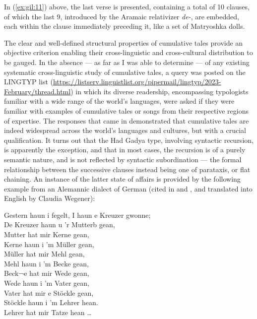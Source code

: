 \documentclass[output=paper,colorlinks,citecolor=brown
]{langscibook}
\begin{document}
\z

In (\ref{ex:gil:11}) above, the last verse is presented, containing a total of 10 clauses, of which the last 9, introduced by the Aramaic relativizer \emph{de-}, are embedded, each within the clause immediately preceding it, like a set of Matryoshka dolls.  

The clear and well-defined structural properties of cumulative tales provide an objective criterion enabling their cross-linguistic and cross-cultural distribution to be gauged.  In the absence — as far as I was able to determine — of any existing systematic cross-linguistic study of cumulative tales, a query was posted on the LINGTYP list (\url{https://listserv.linguistlist.org/pipermail/lingtyp/2023-February/thread.html}) in which its diverse readership, encompassing typologists familiar with a wide range of the world's languages, were asked if they were familiar with examples of cumulative  tales or songs from their respective regions of expertise.  The responses that came in demonstrated that cumulative tales are indeed widespread across the world's languages and cultures, but with a crucial qualification.  It turns out that the Had Gadya type, involving syntactic recursion, is apparently the exception, and that in most cases, the recursion is of a purely semantic nature, and is not reflected by syntactic subordination — the formal relationship between the successive clauses instead being one of parataxis, or flat chaining.  An instance of the latter state of affairs is provided by the following example from an Alemannic dialect of German (cited in 
\cite[65]{meier1851deutsche} and \cite[39]{newell1905passover}, and translated into English by Claudia Wegener):

\ea \label{ex:gil:11}

Gestern haun i fegelt, I haun e Kreuzer gwonne;\\
De Kreuzer haun u 'r Mutterb gean,\\
Mutter hat mir Kerne gean,\\
Kerne haun i 'm Müller gean,\\
Müller hat mir Mehl gean,\\
Mehl haun i 'm Becke gean,\\
Beck¬e hat mir Wede gean,\\
Wede haun i 'm Vater gean,\\
Vater hat mir e Stöckle gean,\\
Stöckle haun i 'm Lehrer hean.\\
Lehrer hat mir Tatze hean  \ldots \\
 
\end{document}
